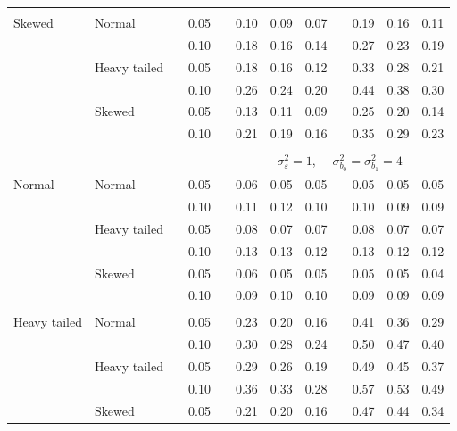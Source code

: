\documentclass[12pt]{article} %
\begin{document}
\begin{table}[ht]
\begin{scriptsize}
\begin{center}
\begin{tabular}{ll p{.1cm} c p{.1cm} rrr p{.1cm} rrr}
             &&&&&&&&&&&\\
Skewed       & Normal       && 0.05 &&  0.10 & 0.09 & 0.07 && 0.19 & 0.16 & 0.11 \\ 
             &              && 0.10 &&  0.18 & 0.16 & 0.14 && 0.27 & 0.23 & 0.19 \\ 
             & Heavy tailed && 0.05 &&  0.18 & 0.16 & 0.12 && 0.33 & 0.28 & 0.21 \\ 
             &              && 0.10 &&  0.26 & 0.24 & 0.20 && 0.44 & 0.38 & 0.30 \\ 
             & Skewed       && 0.05 &&  0.13 & 0.11 & 0.09 && 0.25 & 0.20 & 0.14 \\ 
             &              && 0.10 &&  0.21 & 0.19 & 0.16 && 0.35 & 0.29 & 0.23 \\ 


&&&&&&&&&&&\\
& && && \multicolumn{7}{c}{$\sigma_{\varepsilon}^2 = 1$, \ \ $\sigma_{b_0}^2 = \sigma_{b_1}^2 = 4$} \\ \cline{6-12}
\rowcolor{gray!20}Normal       & Normal       && 0.05 &&  0.06 & 0.05 & 0.05 && 0.05 & 0.05 & 0.05 \\ 
\rowcolor{gray!20}             &              && 0.10 &&  0.11 & 0.12 & 0.10 && 0.10 & 0.09 & 0.09 \\ 
\rowcolor{gray!20}             & Heavy tailed && 0.05 &&  0.08 & 0.07 & 0.07 && 0.08 & 0.07 & 0.07 \\ 
\rowcolor{gray!20}             &              && 0.10 &&  0.13 & 0.13 & 0.12 && 0.13 & 0.12 & 0.12 \\ 
\rowcolor{gray!20}             & Skewed       && 0.05 &&  0.06 & 0.05 & 0.05 && 0.05 & 0.05 & 0.04 \\ 
\rowcolor{gray!20}             &              && 0.10 &&  0.09 & 0.10 & 0.10 && 0.09 & 0.09 & 0.09 \\
             &&&&&&&&&&&\\ 
Heavy tailed & Normal       && 0.05 &&  0.23 & 0.20 & 0.16 && 0.41 & 0.36 & 0.29 \\ 
             &              && 0.10 &&  0.30 & 0.28 & 0.24 && 0.50 & 0.47 & 0.40 \\ 
             & Heavy tailed && 0.05 &&  0.29 & 0.26 & 0.19 && 0.49 & 0.45 & 0.37 \\ 
             &              && 0.10 &&  0.36 & 0.33 & 0.28 && 0.57 & 0.53 & 0.49 \\ 
             & Skewed       && 0.05 &&  0.21 & 0.20 & 0.16 && 0.47 & 0.44 & 0.34 \\ 

\end{tabular}
\end{center}
\end{scriptsize}
\end{table}
\end{document}
